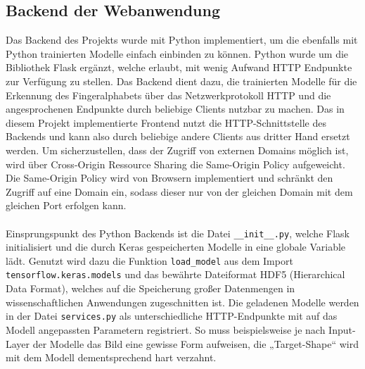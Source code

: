 \documentclass[11pt,bibliography=totocnumbered]{scrartcl}
\begin{document}
\subsection{Backend der Webanwendung}
Das Backend des Projekts wurde mit Python implementiert, um die ebenfalls mit Python trainierten Modelle einfach einbinden zu können. Python wurde um die Bibliothek Flask ergänzt, welche erlaubt, mit wenig Aufwand HTTP Endpunkte zur Verfügung zu stellen. Das Backend dient dazu, die trainierten Modelle für die Erkennung des Fingeralphabets über das Netzwerkprotokoll HTTP und die angesprochenen Endpunkte durch beliebige Clients nutzbar zu machen. Das in diesem Projekt implementierte Frontend nutzt die HTTP-Schnittstelle des Backends und kann also durch beliebige andere Clients aus dritter Hand ersetzt werden. Um sicherzustellen, dass der Zugriff von externen Domains möglich ist, wird über Cross-Origin Ressource Sharing die Same-Origin Policy aufgeweicht. Die Same-Origin Policy wird von Browsern implementiert und schränkt den Zugriff auf eine Domain ein, sodass dieser nur von der gleichen Domain mit dem gleichen Port erfolgen kann.
\\\\
Einsprungspunkt des Python Backends ist die Datei \lstinline[language=pythoninline]|__init__.py|, welche Flask initialisiert und die durch Keras gespeicherten Modelle in eine globale Variable lädt. Genutzt wird dazu die Funktion \lstinline[language=pythoninline]|load_model| aus dem Import \lstinline[language=pythoninline]|tensorflow.keras.models| und das bewährte Dateiformat HDF5 (Hierarchical Data Format), welches auf die Speicherung großer Datenmengen in wissenschaftlichen Anwendungen zugeschnitten ist. Die geladenen Modelle werden in der Datei \lstinline[language=pythoninline]|services.py| als unterschiedliche HTTP-Endpunkte mit auf das Modell angepassten Parametern registriert. So muss beispielsweise je nach Input-Layer der Modelle das Bild eine gewisse Form aufweisen, die „Target-Shape“ wird mit dem Modell dementsprechend hart verzahnt. 
\end{document}
